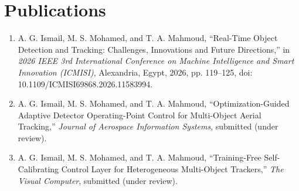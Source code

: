 \chapter*{Publications}

\begin{enumerate}
\item A. G. Ismail, M. S. Mohamed, and T. A. Mahmoud, ``Real-Time Object Detection and Tracking: Challenges, Innovations and Future Directions,'' in \emph{2026 IEEE 3rd International Conference on Machine Intelligence and Smart Innovation (ICMISI)}, Alexandria, Egypt, 2026, pp. 119--125, doi: 10.1109/ICMISI69868.2026.11583994.
\item A. G. Ismail, M. S. Mohamed, and T. A. Mahmoud, ``Optimization-Guided Adaptive Detector Operating-Point Control for Multi-Object Aerial Tracking,'' \emph{Journal of Aerospace Information Systems}, submitted (under review).
\item A. G. Ismail, M. S. Mohamed, and T. A. Mahmoud, ``Training-Free Self-Calibrating Control Layer for Heterogeneous Multi-Object Trackers,'' \emph{The Visual Computer}, submitted (under review).
\end{enumerate}
